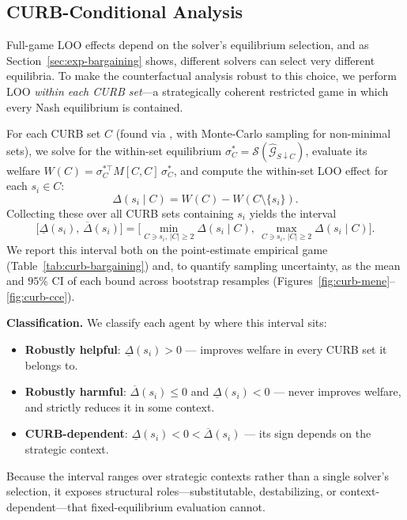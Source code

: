 \documentclass[sigconf,anonymous]{aamas}
\begin{document}
\subsection{CURB-Conditional Analysis}
\label{sec:curb-conditional}

Full-game LOO effects depend on the solver's equilibrium selection, and as Section~\ref{sec:exp-bargaining} shows, different solvers can select very different equilibria. To make the counterfactual analysis robust to this choice, we perform LOO \emph{within each CURB set}---a strategically coherent restricted game in which every Nash equilibrium is contained.

For each CURB set $C$ (found via \citet{Klimm2009FindingAM}, with Monte-Carlo sampling for non-minimal sets), we solve for the within-set equilibrium $\sigma^*_C = \mathcal{S}(\hat{\mathcal{G}}_{S \downarrow C})$, evaluate its welfare $W(C) = \sigma_C^{*\top} M[C, C]\,\sigma^*_C$, and compute the within-set LOO effect for each $s_i \in C$:
\begin{equation}
  \Delta(s_i \mid C) = W(C) - W(C \setminus \{s_i\}).
\end{equation}
Collecting these over all CURB sets containing $s_i$ yields the interval
\begin{equation}
  \big[\underline{\Delta}(s_i),\, \overline{\Delta}(s_i)\big]
  = \Big[\min_{C \ni s_i,\, |C| \geq 2} \Delta(s_i \mid C),\ \max_{C \ni s_i,\, |C| \geq 2} \Delta(s_i \mid C)\Big].
\end{equation}
We report this interval both on the point-estimate empirical game (Table~\ref{tab:curb-bargaining}) and, to quantify sampling uncertainty, as the mean and $95\%$ CI of each bound across bootstrap resamples (Figures~\ref{fig:curb-mene}--\ref{fig:curb-cce}).

\textbf{Classification.} We classify each agent by where this interval sits:
\begin{itemize}
  \item \textbf{Robustly helpful}: $\underline{\Delta}(s_i) > 0$ --- improves welfare in every CURB set it belongs to.
  \item \textbf{Robustly harmful}: $\overline{\Delta}(s_i) \leq 0$ and $\underline{\Delta}(s_i) < 0$ --- never improves welfare, and strictly reduces it in some context.
  \item \textbf{CURB-dependent}: $\underline{\Delta}(s_i) < 0 < \overline{\Delta}(s_i)$ --- its sign depends on the strategic context.
\end{itemize}
Because the interval ranges over strategic contexts rather than a single solver's selection, it exposes structural roles---substitutable, destabilizing, or context-dependent---that fixed-equilibrium evaluation cannot.
\end{document}
